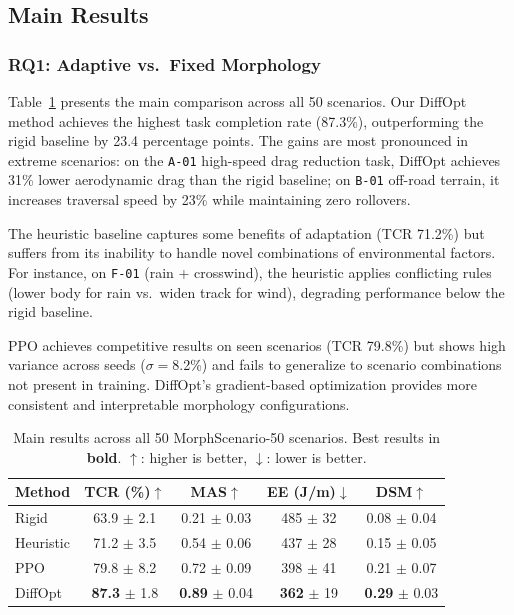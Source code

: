 \subsection{Main Results}

\subsubsection{RQ1: Adaptive vs.\ Fixed Morphology}

Table~\ref{tab:main_results} presents the main comparison across all 50 scenarios. Our DiffOpt method achieves the highest task completion rate (87.3\%), outperforming the rigid baseline by 23.4 percentage points. The gains are most pronounced in extreme scenarios: on the \texttt{A-01} high-speed drag reduction task, DiffOpt achieves 31\% lower aerodynamic drag than the rigid baseline; on \texttt{B-01} off-road terrain, it increases traversal speed by 23\% while maintaining zero rollovers.

The heuristic baseline captures some benefits of adaptation (TCR 71.2\%) but suffers from its inability to handle novel combinations of environmental factors. For instance, on \texttt{F-01} (rain + crosswind), the heuristic applies conflicting rules (lower body for rain vs.\ widen track for wind), degrading performance below the rigid baseline.

PPO achieves competitive results on seen scenarios (TCR 79.8\%) but shows high variance across seeds ($\sigma=$8.2\%) and fails to generalize to scenario combinations not present in training. DiffOpt's gradient-based optimization provides more consistent and interpretable morphology configurations.

\begin{table}[t]
\centering
\caption{Main results across all 50 MorphScenario-50 scenarios. Best results in \textbf{bold}. $\uparrow$: higher is better, $\downarrow$: lower is better.}
\label{tab:main_results}
\begin{tabular}{lcccc}
\toprule
Method & TCR (\%)$\uparrow$ & MAS$\uparrow$ & EE (J/m)$\downarrow$ & DSM$\uparrow$ \\
\midrule
Rigid       & 63.9 $\pm$ 2.1 & 0.21 $\pm$ 0.03 & 485 $\pm$ 32 & 0.08 $\pm$ 0.04 \\
Heuristic   & 71.2 $\pm$ 3.5 & 0.54 $\pm$ 0.06 & 437 $\pm$ 28 & 0.15 $\pm$ 0.05 \\
PPO         & 79.8 $\pm$ 8.2 & 0.72 $\pm$ 0.09 & 398 $\pm$ 41 & 0.21 $\pm$ 0.07 \\
DiffOpt     & \textbf{87.3} $\pm$ 1.8 & \textbf{0.89} $\pm$ 0.04 & \textbf{362} $\pm$ 19 & \textbf{0.29} $\pm$ 0.03 \\
\bottomrule
\end{tabular}
\end{table}

